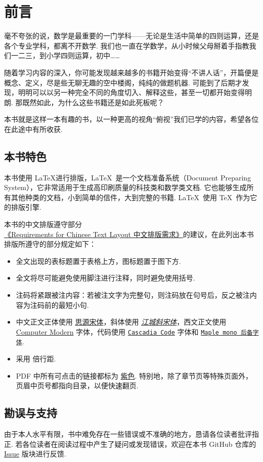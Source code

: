 \chapter{前言}

毫不夸张的说，数学是最重要的一门学科——无论是生活中简单的四则运算，还是各个专业学科，都离不开数学. 我们也一直在学数学，从小时候父母掰着手指教我们一二三，到小学四则运算，初中……

随着学习内容的深入，你可能发现越来越多的书籍开始变得“不讲人话”，开篇便是概念、定义，尽是些无聊无趣的空中楼阁，纯纯的做题机器. 可能到了后期才发现，明明可以以另一种完全不同的角度切入、解释这些，甚至一切都开始变得明朗. 那既然如此，为什么这些书籍还是如此死板呢？

本书就是这样一本有趣的书，以一种更高的视角“俯视”我们已学的内容，希望各位在此途中有所收获.

\section*{本书特色}

本书使用 \LaTeX 进行排版，\LaTeX\ 是一个文档准备系统（Document Preparing System），它非常适用于生成高印刷质量的科技类和数学类文档. 它也能够生成所有其他种类的文档，小到简单的信件，大到完整的书籍. \LaTeX\ 使用 \TeX\ 作为它的排版引擎. \cite{lshort}

本书的中文排版遵守部分\href{https://w3c.github.io/clreq}{《Requirements for Chinese Text Layout 中文排版需求》}的建议，在此列出本书排版所遵守的部分规定如下：

\begin{itemize}
  \item 全文出现的表标题置于表格上方，图标题置于图下方.
  \item 全文将尽可能避免使用脚注进行注释，同时避免使用括号.
  \item 注码将紧跟被注内容：若被注文字为完整句，则注码放在句号后，反之被注内容为注码前的最短小句.
  \item 中文正文正体使用 \href{https://github.com/adobe-fonts/source-han-serif}{思源宋体}，斜体使用 \href{https://www.maoken.com/freefonts/4679.html}{\textit{江城斜宋体}}，西文正文使用 \href{https://en.wikipedia.org/wiki/Computer_Modern}{Computer Modern} 字体，代码使用 \href{https://github.com/microsoft/cascadia-code}{\texttt{Cascadia Code}} 字体和 \href{https://github.com/subframe7536/maple-font}{\texttt{Maple mono 后备字体}}.
  \item 采用  倍行距.
  \item PDF 中所有可点击的链接都标为 \href{https://www.color-hex.com/color/c678dd}{紫色}. 特别地，除了章节页等特殊页面外，页眉中页号都指向目录，以便快速翻页.
\end{itemize}

\section*{勘误与支持}

由于本人水平有限，书中难免存在一些错误或不准确的地方，恳请各位读者批评指正. 若各位读者在阅读过程中产生了疑问或发现错误，欢迎在本书 GitHub 仓库的 \href{https://github.com/Cierra-Runis/math/issues}{Issue} 版块进行反馈.

\begin{flushright}
  \href{https://github.com/Cierra-Runis}{\creator} \\
  \latestdate
\end{flushright}
